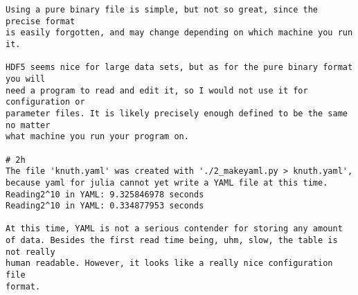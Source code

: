 \documentclass[11pt]{article}
\begin{document}
\begin{verbatim}
Using a pure binary file is simple, but not so great, since the precise format
is easily forgotten, and may change depending on which machine you run it.

HDF5 seems nice for large data sets, but as for the pure binary format you will
need a program to read and edit it, so I would not use it for configuration or
parameter files. It is likely precisely enough defined to be the same no matter
what machine you run your program on.

# 2h
The file 'knuth.yaml' was created with './2_makeyaml.py > knuth.yaml',
because yaml for julia cannot yet write a YAML file at this time.
Reading2^10 in YAML: 9.325846978 seconds
Reading2^10 in YAML: 0.334877953 seconds

At this time, YAML is not a serious contender for storing any amount
of data. Besides the first read time being, uhm, slow, the table is not really
human readable. However, it looks like a really nice configuration file
format.
\end{verbatim}
\end{document}
